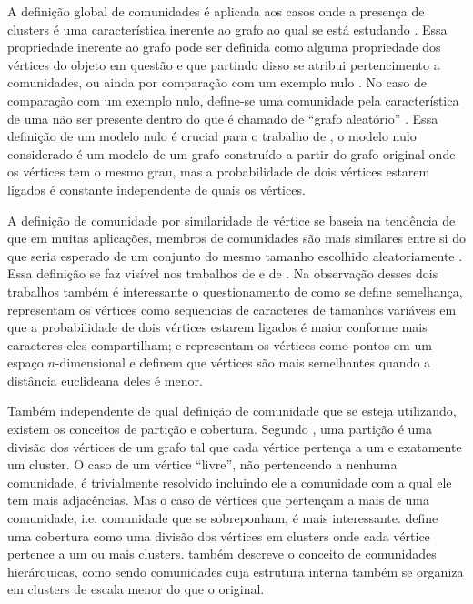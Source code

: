 \documentclass[notes.tex]{subfiles}
\begin{document}
A definição global de comunidades é aplicada aos casos onde a presença de clusters é uma característica inerente ao grafo ao qual se está estudando .
Essa propriedade inerente ao grafo pode ser definida como alguma propriedade dos vértices do objeto em questão e que partindo disso se atribui pertencimento a comunidades, ou ainda por comparação com um exemplo nulo .
No caso de comparação com um exemplo nulo, define-se uma comunidade pela característica de uma não ser presente dentro do que é chamado de ``grafo aleatório'' \cite{fortunato2010community}.
Essa definição de um modelo nulo é crucial para o trabalho de , o modelo nulo considerado é um modelo de um grafo construído a partir do grafo original onde os vértices tem o mesmo grau, mas a probabilidade de dois vértices estarem ligados é constante independente de quais os vértices.

A definição de comunidade por similaridade de vértice se baseia na tendência de que em muitas aplicações, membros de comunidades são mais similares entre si do que seria esperado de um conjunto do mesmo tamanho escolhido aleatoriamente \cite{fortunato2010community}.
Essa definição se faz visível nos trabalhos de  e de .
Na observação desses dois trabalhos também é interessante o questionamento de como se define semelhança,  representam os vértices como sequencias de caracteres de tamanhos variáveis em que a probabilidade de dois vértices estarem ligados é maior conforme mais caracteres eles compartilham; e  representam os vértices como pontos em um espaço $n$-dimensional e definem que vértices são mais semelhantes quando a distância euclideana deles é menor.

Também independente de qual definição de comunidade que se esteja utilizando, existem os conceitos de partição e cobertura.
Segundo , uma partição é uma divisão dos vértices de um grafo tal que cada vértice pertença a um e exatamente um cluster.
O caso de um vértice ``livre'', não pertencendo a nenhuma comunidade, é trivialmente resolvido incluindo ele a comunidade com a qual ele tem mais adjacências.
Mas o caso de vértices que pertençam a mais de uma comunidade, i.e. comunidade que se sobreponham, é mais interessante.
 define uma cobertura como uma divisão dos vértices em clusters onde cada vértice pertence a um ou mais clusters.
 também descreve o conceito de comunidades hierárquicas, como sendo comunidades cuja estrutura interna também se organiza em clusters de escala menor do que o original.
\end{document}

